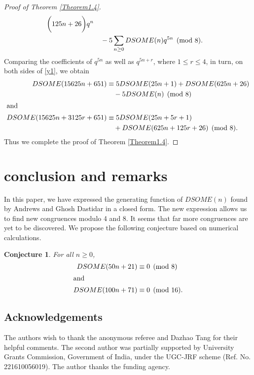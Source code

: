 \documentclass[12pt]{amsart}
\newtheorem{conjecture}[theorem]{Conjecture}
\theoremstyle{definition}
\numberwithin{equation}{section}
\begin{document}
\begin{proof}[Proof of Theorem \ref{Theorem1.4}]
\begin{align}
\bigg(125n
+26\bigg)q^n\notag\\&\quad-5\sum_{n\geq0}DSOME(n)q^{5n}\pmod{8}.\notag
     \end{align}
Comparing the coefficients of $q^{5n}$ as well as $q^{5n+r}$, where  $1\leq r\leq4$, in turn,    on both sides of \eqref{y1}, we obtain
  \begin{align*} DSOME(15625n+651)&\equiv 5DSOME(25n+1)+DSOME(625n+26)\\ &\quad-5DSOME(n)\pmod{8}\\\intertext{and}
 DSOME(15625n+3125r+651)&\equiv 5DSOME(25n+5r+1)\\
&\quad+DSOME(625n
+125r+26)\pmod{8}\notag.
\end{align*}
Thus we  complete the proof of Theorem \ref{Theorem1.4}.
  \end{proof}
\section{conclusion and remarks}
In this paper, we have expressed the generating function of $DSOME(n)$ found by Andrews and Ghosh Dastidar in a closed form. The new expression allows us to find new congruences modulo 4 and 8. It seems that far more congruences are yet to be discovered. We propose the following conjecture based on numerical calculations.
\begin{conjecture} For all $n\geq0$,
    \begin{align*}
        DSOME(50n+21)&\equiv0\pmod{8}\\\intertext{and}
        DSOME(100n+71)&\equiv0\pmod{16}.
    \end{align*}
\end{conjecture}

\subsection*{Acknowledgements}
The authors wish to thank the anonymous referee and Dazhao Tang for their helpful comments. The second author was partially supported by University Grants Commission, Government of India, under the UGC-JRF scheme (Ref. No. 221610056019). The author thanks the funding agency.


\normalsize
\end{document}
